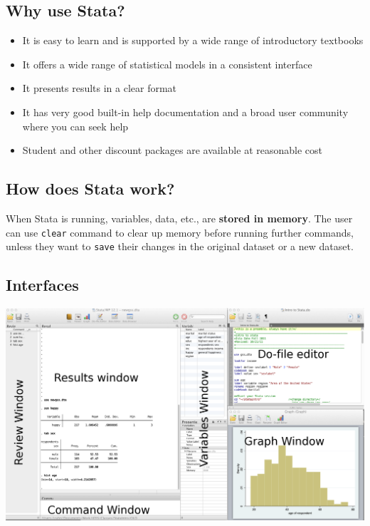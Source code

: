 \documentclass[
]{book}
\providecommand{\tightlist}{%
  \setlength{\itemsep}{0pt}\setlength{\parskip}{0pt}}
\begin{document}
\hypertarget{why-use-stata}{%
\subsection{Why use Stata?}\label{why-use-stata}}

\begin{itemize}
\tightlist
\item
  It is easy to learn and is supported by a wide range of introductory textbooks
\item
  It offers a wide range of statistical models in a consistent interface
\item
  It presents results in a clear format
\item
  It has very good built-in help documentation and a broad user community where you can seek help
\item
  Student and other discount packages are available at reasonable cost
\end{itemize}

\hypertarget{how-does-stata-work}{%
\subsection{How does Stata work?}\label{how-does-stata-work}}

When Stata is running, variables, data, etc., are \textbf{stored in memory}.
The user can use \texttt{clear} command to clear up memory before running further commands,
unless they want to \texttt{save} their changes in the original dataset or a new dataset.

\hypertarget{interfaces-2}{%
\subsection{Interfaces}\label{interfaces-2}}

\includegraphics{Stata/StataIntro/images/StataInterface.png}
\end{document}
